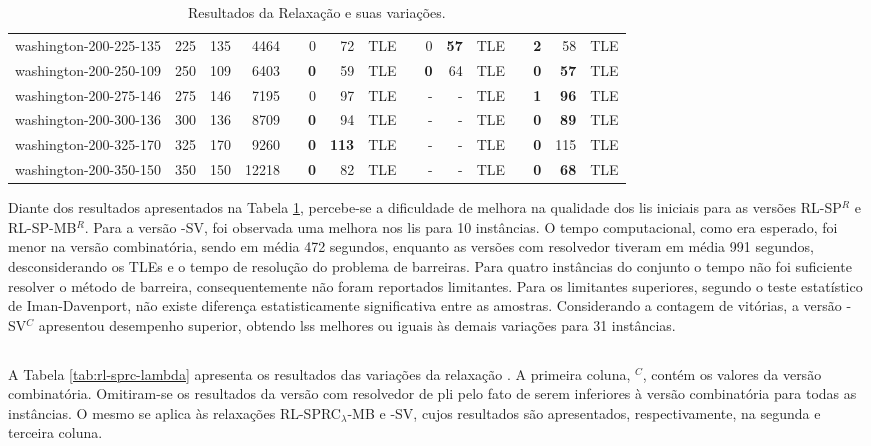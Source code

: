 \begin{table}[!ht]
{\begin{tabular}{lrrrrrrrrrrrlrrr}
washington-200-225-135 & 225 & 135 & 4464 &  & 0 & 72 & TLE &  & 0 & \textbf{57} & TLE &  & \textbf{2} & 58 & TLE \\
washington-200-250-109 & 250 & 109 & 6403 &  & \textbf{0} & 59 & TLE &  & \textbf{0} & 64 & TLE &  & \textbf{0} & \textbf{57} & TLE \\
washington-200-275-146 & 275 & 146 & 7195 &  & 0 & 97 & TLE &  & - & - & TLE &  & \textbf{1} & \textbf{96} & TLE \\
washington-200-300-136 & 300 & 136 & 8709 &  & \textbf{0} & 94 & TLE &  & - & - & TLE &  & \textbf{0} & \textbf{89} & TLE \\
washington-200-325-170 & 325 & 170 & 9260 &  & \textbf{0} & \textbf{113} & TLE &  & - & - & TLE &  & \textbf{0} & 115 & TLE \\
washington-200-350-150 & 350 & 150 & 12218 &  & \textbf{0} & 82 & TLE &  & - & - & TLE &  & \textbf{0} & \textbf{68} & TLE \\ \hline
\end{tabular}%
}
\caption{Resultados da Relaxação {\rlu} e suas variações.}
\label{tab:rl-sp}
\end{table}

Diante  dos  resultados apresentados  na  Tabela  \ref{tab:rl-sp}, percebe-se  a
dificuldade  de melhora  na qualidade  dos  \gls{li}s iniciais  para as  versões
RL-SP$^{R}$ e RL-SP-MB$^{R}$. Para a versão {\rlu}-SV, foi observada uma melhora
nos \gls{li}s para 10 instâncias. O  tempo computacional, como era esperado, foi
menor na versão  combinatória, sendo em média 472 segundos,  enquanto as versões
com resolvedor tiveram em média 991  segundos, desconsiderando os TLEs e o tempo
de resolução  do problema  de barreiras.  Para quatro  instâncias do  conjunto o
tempo não  foi suficiente  resolver o método  de barreira,  consequentemente não
foram  reportados limitantes.  Para os  limitantes superiores,  segundo o  teste
estatístico   de   Iman-Davenport,   não   existe   diferença   estatisticamente
significativa entre as  amostras. Considerando a contagem de  vitórias, a versão
{\rlu}-SV$^C$  apresentou desempenho  superior,  obtendo  \gls{ls}s melhores  ou
iguais às demais variações para 31 instâncias.
\newpage

\subsection{\rld}

A  Tabela  \ref{tab:rl-sprc-lambda} apresenta  os  resultados  das variações  da
relaxação {\rld}.  A primeira  coluna, {\rld}$^C$, contém  os valores  da versão
combinatória. Omitiram-se  os resultados da  versão com resolvedor  de \gls{pli}
pelo fato de serem inferiores à  versão combinatória para todas as instâncias. O
mesmo  se  aplica  às   relaxações  RL-SPRC$_{\lambda}$-MB  e  {\rld}-SV,  cujos
resultados são apresentados, respectivamente, na segunda e terceira coluna.

